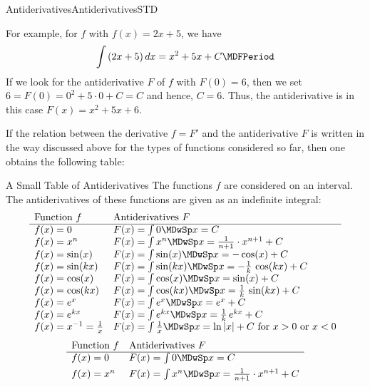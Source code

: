 \begin{MXContent}{Antiderivatives}{Antiderivatives}{STD}
\begin{MExample}
For example, for $f$ with $f(x) = 2x + 5$, we have
\[
\int \left( 2 x + 5 \right) \MD x = x^2 + 5x + C \MDFPeriod %
\]
If we look for the antiderivative $F$ of $f$ with $F(0) = 6$, then we set 
$6 = F(0) = 0^2 + 5 \cdot 0 + C = C$ and hence, $C = 6$. Thus, the 
antiderivative is in this case $F(x) = x^2 + 5 x + 6$.
\end{MExample}

If the relation between the derivative $f = F'$ and the antiderivative $F$
is written in the way discussed above for the types of functions considered so far, then one obtains
the following table:

\begin{MXInfo}{A Small Table of Antiderivatives}%
%
The functions $f$ are considered on an interval. The antiderivatives of these 
functions are given as an indefinite integral:
\ifttm
\[
\begin{array}{ll}
\text{Function } f & \text{Antiderivatives } F \\
\hline
f(x) = 0                    & F(x) = \int 0 \MDwSp x = C \\
f(x) = x^n                  & F(x) = \int x^n \MDwSp x = \frac{1}{n+1} \cdot x^{n+1} + C \\
f(x) = \sin(x)              & F(x) = \int \sin(x) \MDwSp x = -\cos(x) + C \\
f(x) = \sin(k x)            & F(x) = \int \sin(k x) \MDwSp x = -\frac{1}{k}\,\cos(k x) + C \\
f(x) = \cos(x)              & F(x) = \int \cos(x) \MDwSp x = \sin(x) + C \\
f(x) = \cos(k x)            & F(x) = \int \cos(k x) \MDwSp x = \frac{1}{k}\,\sin(k x) + C \\
f(x) = \MEU^x               & F(x) = \int \MEU^x \MDwSp x = \MEU^x + C \\
f(x) = \MEU^{k x}           & F(x) = \int \MEU^{k x} \MDwSp x = \frac{1}{k}\,\MEU^{k x} + C \\
f(x) = x^{-1} = \frac{1}{x} & F(x) = \int \frac{1}{x} \MDwSp x = \ln|x| + C  %
\text{ for } x > 0 \text{ or } x < 0 %
\end{array}
\]
\else
\[
\begin{array}{ll}
\text{Function } f & \mbox{Antiderivatives } F \\
\hline
f(x) = 0                    & F(x) = \int 0 \MDwSp x = C \\[1ex]
f(x) = x^n                  & F(x) = \int x^n \MDwSp x = \frac{1}{n+1} \cdot x^{n+1} + C \\[1ex]

\end{array}\]
\end{MXInfo}
\end{MXContent}
